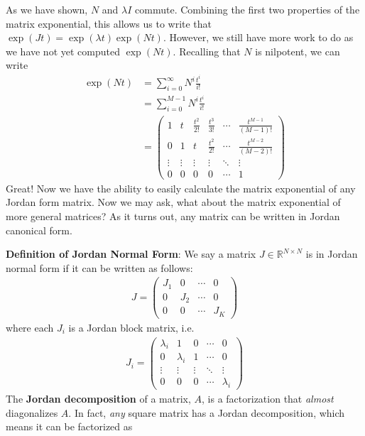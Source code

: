 \documentclass[a4paper,11pt]{exam}
\newcounter{ct}
\newcommand{\field}[1]{\ensuremath{\mathbb{#1}}}
\newcommand{\reals}{\field{R}}
\begin{document}
\begin{questions}
As we have shown, $N$ and $\lambda I$ commute.  Combining the first two properties of the matrix exponential, this allows us to write that $    \exp(J t) = \exp(\lambda t) \exp(N t)$.  However, we still have more work to do as we have not yet computed $\exp(Nt)$.  Recalling that $N$ is nilpotent, we can write
\begin{align}
    \exp(Nt) &= \sum_{i=0}^{\infty} N^i \frac{t^i}{i!}\\
    &= \sum_{i=0}^{M-1} N^i \frac{t^i}{i!}\\
    &= \begin{pmatrix} 1 & t & \frac{t^2}{2!} & \frac{t^3}{3!} & \cdots & \frac{t^{M-1}}{(M-1)!}\\
        0 & 1 & t & \frac{t^2}{2!} & \cdots & \frac{t^{M-2}}{(M-2)!}\\
        \vdots & \vdots & \vdots & \vdots & \ddots & \vdots\\
        0 & 0 & 0 & 0 & \cdots & 1
    \end{pmatrix}
\end{align}
Great! Now we have the ability to easily calculate the matrix exponential of any Jordan form matrix.  Now we may ask, what about the matrix exponential of more general matrices? As it turns out, any matrix can be written in Jordan canonical form.
\begin{tcolorbox}[colback=black!1!,title=Jordan normal form]
    \textbf{Definition of Jordan Normal Form}: We say a matrix $J \in \reals^{N \times N}$ is in Jordan normal form if it can be written as follows:
    \begin{align}
        J = \begin{pmatrix} J_1 & 0 & \cdots & 0\\
        0 & J_2 & \cdots & 0\\
        0 & 0 & \cdots & J_K\end{pmatrix}
    \end{align}
    where each $J_i$ is a Jordan block matrix, i.e.
    \begin{align}
        J_i = \begin{pmatrix} \lambda_i & 1 & 0 & \cdots & 0\\
            0 & \lambda_i & 1 & \cdots & 0\\
            \vdots & \vdots & \vdots & \ddots & \vdots\\
            0 & 0 & 0 & \cdots & \lambda_i
        \end{pmatrix}
    \end{align}
    The \textbf{Jordan decomposition} of a matrix, $A$, is a factorization that \textit{almost} diagonalizes $A$.  In fact, \textit{any} square matrix has a Jordan decomposition, which means it can be factorized as

\end{tcolorbox}
\end{questions}
\end{document}
